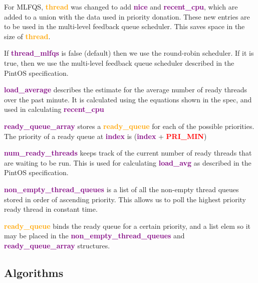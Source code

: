 \documentclass{report}
\newcommand{\file}[1]{\textcolor{green}{\textbf{#1}}}
\newcommand{\struct}[1]{\textcolor{orange}{\textbf{#1}}}
\newcommand{\var}[1]{\textcolor{purple}{\textbf{#1}}}
\newcommand{\const}[1]{\textcolor{red}{\textbf{#1}}}
\newcommand{\pintoscode}[4]{}
\begin{document}
                \pintoscode{91}{123}{thread.h}{thread.h}
                For MLFQS, \struct{thread} was changed to add \var{nice} and \var{recent\_cpu}, which are added to a union with the data used in priority donation. These new entries are to be used in the multi-level feedback queue scheduler. This saves space in the size of \struct{thread}.

                \pintoscode{137}{137}{thread.h}{thread.h}
                If \var{thread\_mlfqs} is false (default) then we use the round-robin scheduler. If it is true, then we use the multi-level feedback queue scheduler described in the PintOS specification.
               
                \pintoscode{72}{72}{thread.c}{thread.c}
                \var{load\_average} describes the estimate for the average number of ready threads over the past minute. It is calculated using the equations shown in the spec, and used in calculating \var{recent\_cpu} 
                
                \pintoscode{68}{69}{thread.c}{thread.c}
                \var{ready\_queue\_array} stores a \struct{ready\_queue} for each of the possible priorities. The priority of a ready queue at \var{index} is (\var{index} + \const{PRI\_MIN})
                
                \pintoscode{62}{63}{thread.c}{thread.c}
                \var{num\_ready\_threads} keeps track of the current number of ready threads that are waiting to be run. This is used for calculating \var{load\_avg} as described in the PintOS specification.
                
                \pintoscode{65}{66}{thread.c}{thread.c}
                \var{non\_empty\_thread\_queues} is a list of all the non-empty thread queues stored in order of ascending priority. This allows us to poll the highest priority ready thread in constant time.

                \pintoscode{125}{131}{thread.h}{thread.h}
                \struct{ready\_queue} binds the ready queue for a certain priority, and a list elem so it may be placed in the \var{non\_empty\_thread\_queues} and \var{ready\_queue\_array} structures.
                

        \subsection*{Algorithms}
\end{document}
